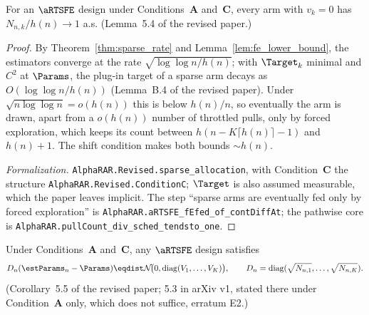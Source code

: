 \begin{lemma}\label{lem:sparse_allocation}
\leanok
{}
For an $\aRTSFE$ design under Conditions~\textbf{A} and~\textbf{C}, every arm with $v_k=0$ has
$N_{n,k}/h(n)\to1$ a.s. (Lemma~5.4 of the revised paper.)
\end{lemma}

\begin{proof}\leanok
{}
By Theorem~\ref{thm:sparse_rate} and Lemma~\ref{lem:fe_lower_bound}, the estimators converge at the
rate $\sqrt{\log\log n/h(n)}$; with $\Target_k$ minimal and $C^2$ at $\Params$, the plug-in target
of a sparse arm decays as $O(\log\log n/h(n))$ (Lemma~B.4 of the revised paper). Under
$\sqrt{n\log\log n}=o(h(n))$ this is below $h(n)/n$, so eventually the arm is drawn, apart from a
$o(h(n))$ number of throttled pulls, only by forced exploration, which keeps its count between
$h(n-K\lceil h(n)\rceil-1)$ and $h(n)+1$. The shift condition makes both bounds $\sim h(n)$.

\emph{Formalization.} \texttt{AlphaRAR.Revised.sparse\_allocation}, with Condition~\textbf{C} the
structure \texttt{AlphaRAR.Revised.ConditionC}; $\Target$ is also assumed measurable, which the
paper leaves implicit. The step ``sparse arms are eventually fed only by forced exploration'' is
\texttt{AlphaRAR.aRTSFE\_fEfed\_of\_contDiffAt}; the pathwise core is
\texttt{AlphaRAR.pullCount\_div\_sched\_tendsto\_one}.
\end{proof}

\begin{corollary}\label{cor:sparse_clt}
\leanok
{}
Under Conditions~\textbf{A} and~\textbf{C}, any $\aRTSFE$ design satisfies
\[
  D_n(\estParams_n-\Params)\eqdist\mathcal{N}\!\big(0,\mathrm{diag}(V_1,\dots,V_K)\big),
  \qquad D_n=\mathrm{diag}(\sqrt{N_{n,1}},\dots,\sqrt{N_{n,K}}).
\]
(Corollary~5.5 of the revised paper; 5.3 in arXiv v1, stated there under Condition~\textbf{A} only,
which does not suffice, erratum E2.)
\end{corollary}

